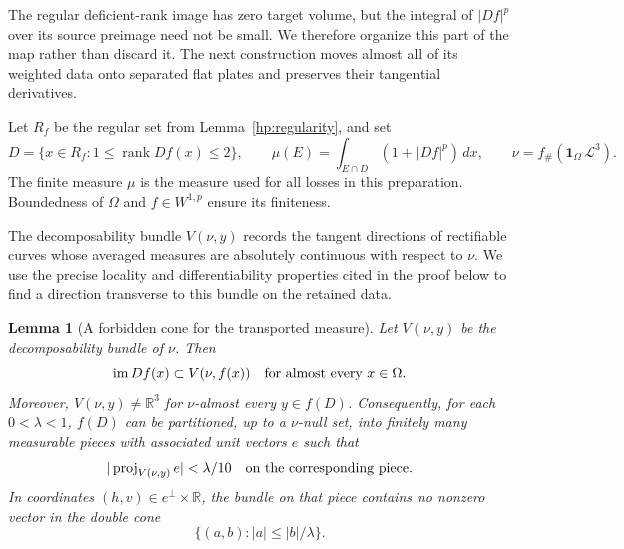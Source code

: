 \documentclass[11pt]{article}
\numberwithin{equation}{section}
\newtheorem{lemma}[theorem]{Lemma}
\theoremstyle{definition}
\theoremstyle{remark}
\begin{document}
The regular deficient-rank image has zero target volume, but the
integral of $|Df|^p$ over its source preimage need not be small.  We
therefore organize this part of the map rather than discard it.
The next construction moves almost all of its weighted data onto
separated flat plates and preserves their tangential derivatives.

Let $R_f$ be the regular set from Lemma~\ref{hp:regularity}, and set
\[
 D=\{x\in R_f:1\le\operatorname{rank} Df(x)\le2\},
 \qquad
 \mu(E)=\int_{E\cap D}(1+|Df|^p)\,dx,
 \qquad
 \nu=f_\#(\mathbf1_\Omega\,\mathcal L^3).
\]
The finite measure $\mu$ is the measure used for all losses in this
preparation.  Boundedness of $\Omega$ and $f\in W^{1,p}$ ensure
its finiteness.

The decomposability bundle $V(\nu,y)$ records the tangent directions
of rectifiable curves whose averaged measures are absolutely continuous
with respect to $\nu$.  We use the precise locality and differentiability
properties cited in the proof below to find a direction transverse to
this bundle on the retained data.

\begin{lemma}[A forbidden cone for the transported measure]
\label{hp:transported-bundle}
Let $V(\nu,y)$ be the decomposability bundle of $\nu$.  Then
\begin{equation}\label{hp:range-in-bundle}
 \operatorname{im}Df(x)\subset V(\nu,f(x))
 \quad\hbox{for almost every }x\in\Omega.
\end{equation}
Moreover, $V(\nu,y)\ne\mathbb R^3$ for $\nu$-almost every $y\in f(D)$.
Consequently, for each $0<\lambda<1$, $f(D)$ can be partitioned,
up to a $\nu$-null set, into finitely many measurable pieces with
associated unit vectors $e$ such that
\begin{equation}\label{hp:almost-normal-direction}
 |\operatorname{proj}_{V(\nu,y)}e|<\lambda/10
 \quad\hbox{on the corresponding piece}.
\end{equation}
In coordinates $(h,v)\in e^\perp\times\mathbb R$, the bundle on that piece
contains no nonzero vector in the double cone
\[
 \{(a,b):|a|\le |b|/\lambda\}.
\]
\end{lemma}
\end{document}
